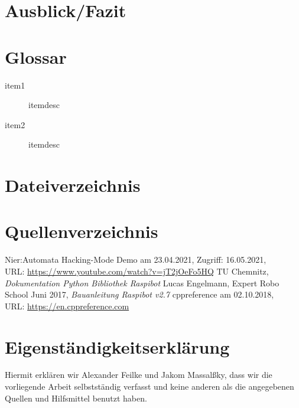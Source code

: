 \documentclass[a4paper,10pt,ngerman,fontsize=12pt]{scrreprt}
\begin{document}
\chapter{Ausblick/Fazit}
\lipsum[3]





\chapter{Glossar}
\begin{description}
\item[item1] itemdesc
\item[item2] itemdesc
\end{description}




\chapter{Dateiverzeichnis}




\chapter{Quellenverzeichnis}
\begin{thebibliography}{999}
     Nier:Automata Hacking-Mode Demo am 23.04.2021,  Zugriff:  16.05.2021, \\ URL:
    \url{https://www.youtube.com/watch?v=jT2jOeFo5HQ}
     TU Chemnitz, \textit{Dokumentation Python Bibliothek Raspibot}
     Lucas Engelmann, Expert Robo School Juni 2017, \textit{Bauanleitung Raspibot v2.7}
     cppreference am 02.10.2018, \\ URL:
    \url{https://en.cppreference.com}
\end{thebibliography}
    




\chapter{Eigenständigkeitserklärung}
Hiermit erklären wir Alexander Feilke und Jakom Massal{\ss}ky, dass wir die vorliegende Arbeit selbstständig verfasst und keine anderen als die angegebenen Quellen und Hilfsmittel benutzt haben.
\end{document}
